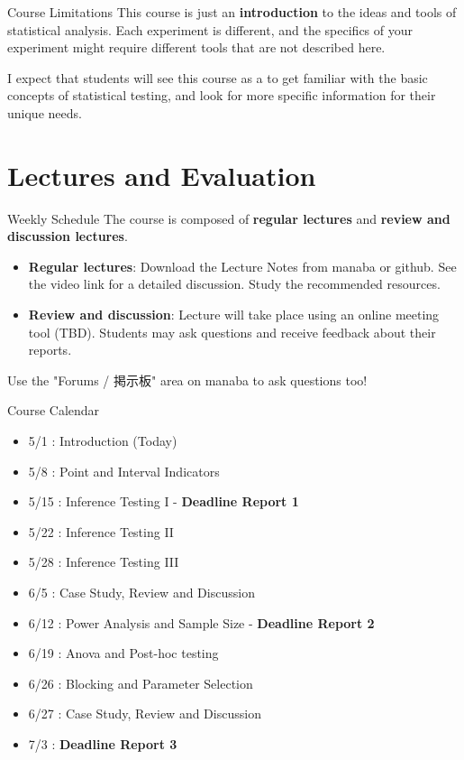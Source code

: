 \documentclass{beamer}
\begin{document}
\begin{CJK}{UTF8}{ipxm}
\begin{frame}{Course Limitations}
  This course is just an {\bf introduction} to the ideas and tools of statistical analysis. Each experiment is different, and the specifics of your experiment might require different tools that are not described here.\bigskip

  I expect that students will see this course as a  to get familiar with the basic concepts of statistical testing, and look for more specific information for their unique needs.
\end{frame}


\section{Lectures and Evaluation}

\begin{frame}{Weekly Schedule}
  The course is composed of {\bf regular lectures} and {\bf review and discussion lectures}.\bigskip

  \begin{itemize}
    \item {\bf Regular lectures}: Download the Lecture Notes from manaba or github. See the video link for a detailed discussion. Study the recommended resources.\bigskip

    \item {\bf Review and discussion}: Lecture will take place using an online meeting tool (TBD). Students may ask questions and receive feedback about their reports.
  \end{itemize}\bigskip

  Use the "Forums / 掲示板" area on manaba to ask questions too!
\end{frame}

\begin{frame}{Course Calendar}
\begin{itemize}
  \item 5/1 : Introduction (Today)
  \item 5/8 : Point and Interval Indicators
  \item 5/15 : Inference Testing I - {\bf Deadline Report 1}
  \item 5/22 : Inference Testing II
  \item 5/28 : Inference Testing III
  \item \alert{6/5 : Case Study, Review and Discussion}
  \item 6/12 : Power Analysis and Sample Size - {\bf Deadline Report 2}
  \item 6/19 : Anova and Post-hoc testing
  \item 6/26 : Blocking and Parameter Selection
  \item \alert{6/27 : Case Study, Review and Discussion}
  \item 7/3 : {\bf Deadline Report 3}
\end{itemize}
\end{frame}


\end{CJK}
\end{document}
